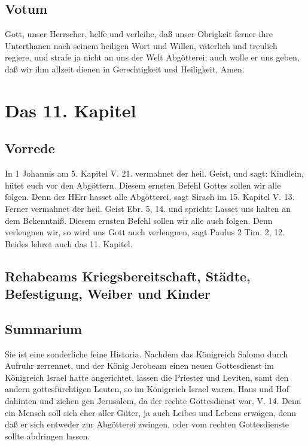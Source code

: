 \section{Votum}

Gott, unser Herrscher, helfe und verleihe, daß unser Obrigkeit ferner ihre Unterthanen nach seinem heiligen Wort und Willen, väterlich und treulich regiere, und strafe ja nicht an uns der Welt Abgötterei; auch wolle er uns geben, daß wir ihm allzeit dienen in Gerechtigkeit und Heiligkeit, Amen.

\chapter{Das 11. Kapitel}

\section{Vorrede}

In 1 Johannis am 5. Kapitel V. 21. vermahnet der heil. Geist, und sagt: Kindlein, hütet euch vor den Abgöttern. Diesem ernsten Befehl Gottes sollen wir alle folgen. Denn der HErr hasset alle Abgötterei, sagt Sirach im 15. Kapitel V. 13. Ferner vermahnet der heil. Geist Ebr. 5, 14. und spricht: Lasset uns halten an dem Bekenntniß. Diesem ernsten Befehl sollen wir alle auch folgen. Denn verleugnen wir, so wird uns Gott auch verleugnen, sagt Paulus 2 Tim. 2, 12. Beides lehret auch das 11. Kapitel.

\section[Rehabeams Kriegsbereitschaft, Städte, Befestigung, Weiber und Kinder]{Rehabeams Kriegsbereitschaft, Städte, Befestigung, Weiber und Kinder}

\section{Summarium}

Sie ist eine sonderliche feine Historia. Nachdem das Königreich Salomo durch Aufruhr zerrennet, und der König Jerobeam einen neuen Gottesdienst im Königreich Israel hatte angerichtet, lassen die Priester und Leviten, samt den andern gottesfürchtigen Leuten, so im Königreich Israel waren, Haus und Hof dahinten und ziehen gen Jerusalem, da der rechte Gottesdienst war, V. 14. Denn ein Mensch soll sich eher aller Güter, ja auch Leibes und Lebens erwägen, denn daß er sich entweder zur Abgötterei zwingen, oder vom rechten Gottesdienste sollte abdringen lassen.

